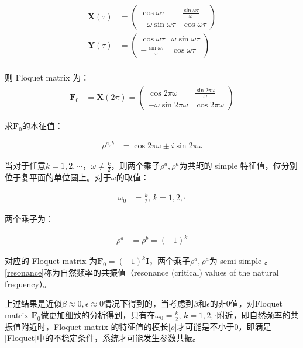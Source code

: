 \begin{align}
    \mathbf{X}(\tau) &= 
    \begin{pmatrix}
        \cos\omega \tau & \frac{\sin\omega \tau}{\omega} \\ 
        -\omega\sin\omega \tau & \cos\omega \tau
    \end{pmatrix} \\
    \mathbf{Y}(\tau) &= 
    \begin{pmatrix}
        \cos\omega \tau & \omega\sin\omega \tau \\ 
        -\frac{\sin\omega \tau}{\omega} & \cos\omega \tau
    \end{pmatrix} \\
\end{align}

则 Floquet matrix 为：
\begin{align}
    \mathbf{F}_{0} &= \mathbf{X}(2\pi) =
    \begin{pmatrix}
        \cos2\pi\omega & \frac{\sin2\pi\omega}{\omega} \\ 
        -\omega\sin2\pi\omega & \cos2\pi\omega
    \end{pmatrix}
\end{align}

求$\mathbf{F}_{0}$的本征值：

\begin{align}
    \rho^{a,b} &= \cos2\pi\omega\pm i\sin2\pi\omega
\end{align}

当对于任意$k=1,2,\cdots$，$\omega\neq\frac{k}{2}$，则两个乘子$\rho^{a},\rho^{a}$为共轭的 simple 特征值，位分别位于复平面的单位圆上。对于$\omega$的取值：

\begin{align}
    \omega_{0} &= \frac{k}{2},\,k=1,2,\cdot \label{resonance}
\end{align}

两个乘子为：

\begin{align}
    \rho^{a} &= \rho^{b} = (-1)^{k}
\end{align}

对应的 Floquet matrix 为$\mathbf{F}_{0}=(-1)^{k}\mathbf{I}$，两个乘子$\rho^{a},\rho^{a}$为 semi-simple 。\eqref{resonance}称为自然频率的共振值（resonance (critical) values of the natural frequency）。

上述结果是近似$\beta\approx0,\epsilon\approx0$情况下得到的，当考虑到$\beta$和$\epsilon$的非0值，对Floquet matrix $\mathbf{F}_{0}$做更加细致的分析得到\cite{seyranian_multiparameter_nodate}，只有在$\omega_{0}=\frac{k}{2},\,k=1,2,\cdot$附近，即自然频率的共振值附近时，Floquet matrix 的特征值的模长$|\rho|$才可能是不小于0，即满足\eqref{Floquet}中的不稳定条件，系统才可能发生参数共振。

